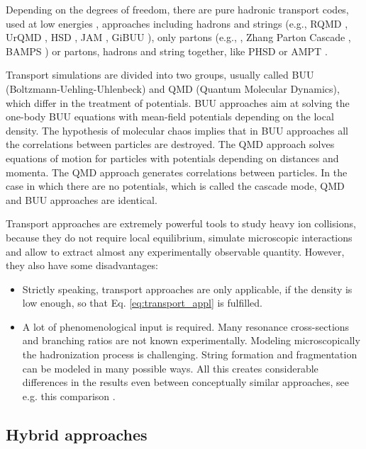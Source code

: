 Depending on the degrees of freedom, there are pure hadronic transport codes,
used at low energies
\cite{Aichelin:1986wa,Ko:1989se,Pang:1992fg,Hartnack:1989sd,Cassing:1990dr},
approaches including hadrons and strings (e.g., RQMD \cite{Sorge:1989vt}, UrQMD
\cite{Bass:1998ca}, HSD \cite{Cassing:2000bj}, JAM \cite{Nara:1999dz}, GiBUU
\cite{Buss:2011mx}), only partons (e.g., \cite{Geiger:1991nj,Molnar:2004yh},
Zhang Parton Cascade \cite{Zhang:1997ej}, BAMPS \cite{Xu:2004mz}) or partons,
hadrons and string together, like PHSD \cite{Cassing:2008sv} or AMPT
\cite{Lin:2004en}.

Transport simulations are divided into two groups, usually called BUU
(Boltzmann-Uehling-Uhlenbeck) and QMD (Quantum Molecular Dynamics), which
differ in the treatment of potentials. BUU approaches aim at solving the one-body
BUU equations with mean-field potentials depending on the local density. The
hypothesis of molecular chaos implies that in BUU approaches all the
correlations between particles are destroyed. The QMD approach solves equations
of motion for particles with potentials depending on distances and momenta. The
QMD approach generates correlations between particles. In the case in which there are no
potentials, which is called the cascade mode, QMD and BUU approaches are
identical.

Transport approaches are extremely powerful tools to study heavy ion collisions,
because they do not require local equilibrium, simulate microscopic interactions
and allow to extract almost any experimentally observable quantity. However, they
also have some disadvantages:

\begin{itemize}
  \item Strictly speaking, transport approaches are only applicable, if the density
        is low enough, so that Eq. \ref{eq:transport_appl} is fulfilled.
  \item A lot of phenomenological input is required. Many resonance cross-sections
        and branching ratios are not known experimentally. Modeling microscopically
        the hadronization process is challenging. String formation and fragmentation
        can be modeled in many possible ways. All this creates considerable
        differences in the results even between conceptually similar approaches,
        see e.g. this comparison \cite{Xu:2016lue}.
\end{itemize}

\subsection{Hybrid approaches} \label{sec:hybrid_appr}

